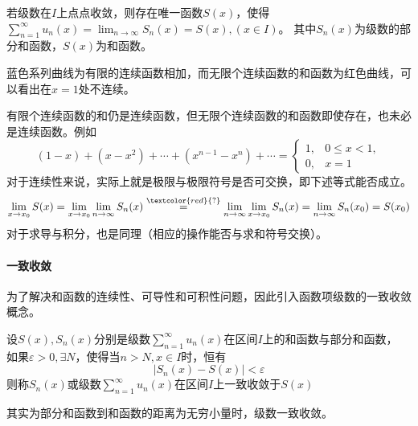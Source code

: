 若级数在$I$上点点收敛，则存在唯一函数$S(x)$，使得$\displaystyle\sum_{n=1}^\infty u_n(x) = \lim_{n\to\infty} S_n(x) = S(x), (x\in I)$。
其中$S_n(x)$为级数的部分和函数，$S(x)$为和函数。

\begin{marginfigure}
    \caption{蓝色系列曲线为有限的连续函数相加，而无限个连续函数的和函数为红色曲线，可以看出在$x=1$处不连续。}
\end{marginfigure}
有限个连续函数的和仍是连续函数，但无限个连续函数的和函数即使存在，也未必是连续函数。例如
\[
    (1-x) + (x-x^2) + \cdots + (x^{n-1}-x^n) + \cdots =
    \begin{cases}
        1, & 0\leq x < 1, \\
        0, & x=1
    \end{cases}
\]
对于连续性来说，实际上就是极限与极限符号是否可交换，即下述等式能否成立。
\[
    \lim_{x\to x_0}S(x)
    =
    \lim_{x\to x_0} \lim_{n\to\infty} S_n(x)
    \stackrel{\textcolor{red}{?}}{=}
    \lim_{n\to\infty} \lim_{x\to x_0} S_n(x)
    =
    \lim_{n\to\infty} S_n(x_0)
    =
    S(x_0)
\]
对于求导与积分，也是同理（相应的操作能否与求和符号交换）。

\paragraph{一致收敛}
为了解决和函数的连续性、可导性和可积性问题，因此引入函数项级数的一致收敛概念。
\begin{definition}
    设$S(x),S_n(x)$分别是级数$\displaystyle\sum_{n=1}^\infty u_n(x)$在区间$I$上的和函数与部分和函数，
    如果$\varepsilon > 0,\exists N$，使得当$n>N,x\in I$时，恒有
    \[ \left| S_n(x) - S(x) \right| < \varepsilon \]
    则称$S_n(x)$或级数$\displaystyle\sum_{n=1}^\infty u_n(x)$在区间$I$上一致收敛于$S(x)$
\end{definition}
其实为部分和函数到和函数的距离为无穷小量时，级数一致收敛。

